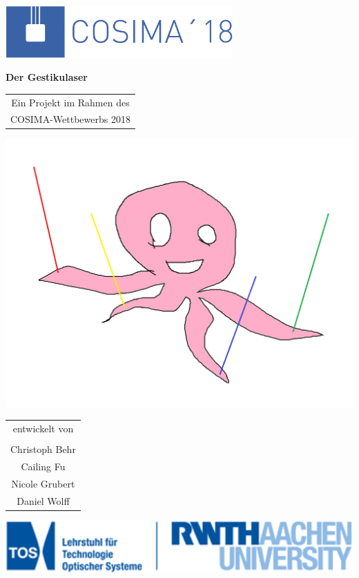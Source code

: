 \documentclass[a4paper,12pt,notumble]{leaflet}
\begin{document}
\begin{center}

\includegraphics[height=2cm]{../Logos/Cosima18.png}

\bfseries\Huge
Der Gestikulaser

\vfill

\normalsize

\begin{tabular}{c}
	Ein Projekt im Rahmen des \\
	COSIMA-Wettbewerbs 2018
\end{tabular}

\vfill
\includegraphics[scale=0.25]{../Logos/gestikulaser.png}
\vfill

\begin{tabular}{c}
	entwickelt von \\ \\
	Christoph Behr \\
	Cailing Fu \\
	Nicole Grubert \\
	Daniel Wolff
\end{tabular}

\vfill

\includegraphics[height=2cm]{../Logos/TOS.png}

\end{center}
\end{document}
